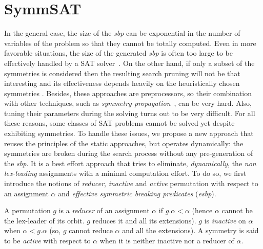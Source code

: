 \chapter{SymmSAT}\label{chap:symmSAT}


In the general case,
the size of the \textit{sbp} can be exponential in the number of variables of
the problem so that they cannot be totally computed. Even in more favorable
situations, the size of the generated \textit{sbp} is often too large to be
effectively handled by a SAT solver~\cite{Luks2004}. On the other hand, if
only a subset of the symmetries is considered then the resulting search pruning
will not be that interesting and its effectiveness depends heavily on the
heuristically chosen symmetries \cite{biere2009handbook}. Besides, these approaches
are preprocessors, so their combination with other techniques, such as
\emph{symmetry propagation}~\cite{Devriendt12}, can be very hard. Also, tuning
their parameters during the solving turns out to be very difficult. For all
these reasons, some classes of SAT problems cannot be solved yet despite
exhibiting symmetries.
To handle these issues, we propose a new
approach that reuses the principles of the static approaches, but operates
dynamically: the symmetries are broken during the search process without any
pre-generation of the \textit{sbp}. It is a best effort approach that tries to eliminate,
\textit{dynamically}, the \textit{non lex-leading} assignments with a minimal
computation effort. To do so, we first introduce the notions of
\textit{reducer}, \textit{inactive} and \textit{active} permutation with
respect to an assignment $\alpha$ and \emph{effective symmetric breaking predicates} (\emph{esbp}).






\begin{definition} A permutation $g$
	is a \emph{reducer} of an assignment $\alpha$ if $g.\alpha < \alpha$ (hence $\alpha$ cannot be
	the lex-leader of its orbit. $g$ reduces it and all its extensions). $g$ is
	\emph{inactive} on $\alpha$ when $\alpha < g.\alpha$ (so, $g$ cannot reduce $\alpha$ and all
	the extensions). A symmetry is said to be \emph{active} with respect to $\alpha$
	when it is neither inactive nor a reducer of $\alpha$. \end{definition}


